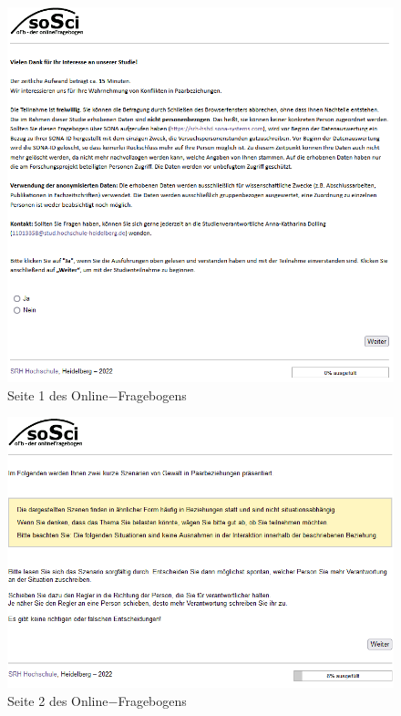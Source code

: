 \begin{appendices}
    \begin{figure}[htb!]
        \centering
            \includegraphics[width=\textwidth, frame]{Seite 1.png}
            \caption[]{Seite 1 des Online$-$Fragebogens}
    \end{figure}

    \newpage
    \begin{figure}[htb!]
        \centering
            \includegraphics[width=\textwidth, frame]{Seite 2.png}
            \caption[]{Seite 2 des Online$-$Fragebogens}
    \end{figure}


\end{appendices}
